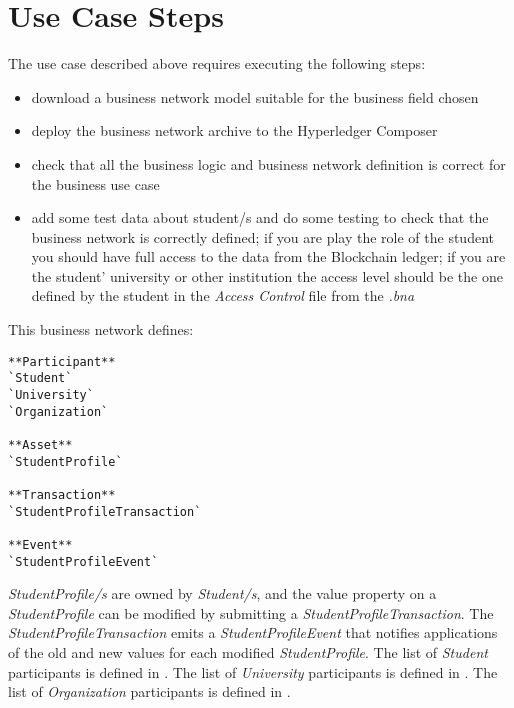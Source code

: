 \section{Use Case Steps}
\label{sub-sec:chapter4-section2}
The use case described above requires executing the following steps:
\begin{itemize}
	\item download a business network model suitable for the business field chosen
	\item deploy the business network archive to the Hyperledger Composer
	\item check that all the business logic and  business network definition is correct for the business use case
	\item add some test data about student/s and do some testing to check that the business network is correctly defined; if you are play the role of the student you should have full access to the data from the Blockchain ledger; if you are the student' university or other institution the access level should be the one defined by the student in the \emph{Access Control} file from the \emph{.bna}	
\end{itemize}

This business network defines:
\begin{verbatim}
**Participant**
`Student`
`University`
`Organization`

**Asset**
`StudentProfile`

**Transaction**
`StudentProfileTransaction`

**Event**
`StudentProfileEvent`
\end{verbatim}

\emph{StudentProfile/s} are owned by \emph{Student/s}, and the value property on a \emph{StudentProfile} can be modified by submitting a \emph{StudentProfileTransaction}. The \emph{StudentProfileTransaction} emits a \emph{StudentProfileEvent} that notifies applications of the old and new values for each modified \emph{StudentProfile}.	
The list of \emph{Student} participants is defined in .
The list of \emph{University} participants is defined in .
The list of \emph{Organization} participants is defined in .



